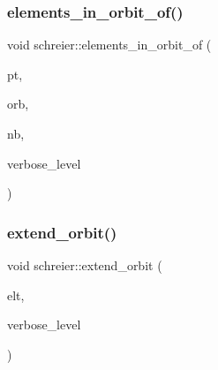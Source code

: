 \mbox{\label{classschreier_a50c0574448d65644e0d408b718662132}} 
\subsubsection{\texorpdfstring{elements\+\_\+in\+\_\+orbit\+\_\+of()}{elements\_in\_orbit\_of()}}
{\footnotesize\ttfamily void schreier\+::elements\+\_\+in\+\_\+orbit\+\_\+of (\begin{DoxyParamCaption}\item[{\mbox{\hyperlink{galois_8h_a09fddde158a3a20bd2dcadb609de11dc}{I\+NT}}}]{pt,  }\item[{\mbox{\hyperlink{galois_8h_a09fddde158a3a20bd2dcadb609de11dc}{I\+NT}} $\ast$}]{orb,  }\item[{\mbox{\hyperlink{galois_8h_a09fddde158a3a20bd2dcadb609de11dc}{I\+NT}} \&}]{nb,  }\item[{\mbox{\hyperlink{galois_8h_a09fddde158a3a20bd2dcadb609de11dc}{I\+NT}}}]{verbose\+\_\+level }\end{DoxyParamCaption})}

\mbox{\label{classschreier_aa466ebd594d89c13454cd4be50bb3a8f}} 
\subsubsection{\texorpdfstring{extend\+\_\+orbit()}{extend\_orbit()}}
{\footnotesize\ttfamily void schreier\+::extend\+\_\+orbit (\begin{DoxyParamCaption}\item[{\mbox{\hyperlink{galois_8h_a09fddde158a3a20bd2dcadb609de11dc}{I\+NT}} $\ast$}]{elt,  }\item[{\mbox{\hyperlink{galois_8h_a09fddde158a3a20bd2dcadb609de11dc}{I\+NT}}}]{verbose\+\_\+level }\end{DoxyParamCaption})}

\mbox{\label{classschreier_a91978aa7871c57d3e1d7b185b9cd688b}} 
